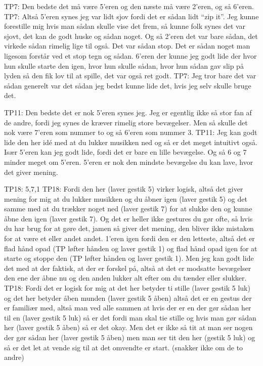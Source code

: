 TP7: Den bedste det må være 5’eren og den næste må være 2’eren, og så 6’eren. 
TP7: Altså 5’eren synes jeg var lidt sjov fordi det er sådan lidt “zip it”. Jeg kunne forestille mig hvis man sådan skulle vise det frem, så kunne folk synes det var sjovt, det kan de godt huske og sådan noget. Og så 2’eren det var bare sådan, det virkede sådan rimelig lige til også. Det var sådan stop. Det er sådan noget man ligesom forstår ved et stop tegn og sådan. 6’eren der kunne jeg godt lide der hvor hun skulle starte den igen, hvor hun skulle sådan, hvor hun sådan gav slip på lyden så den fik lov til at spille, det var også ret godt. 
TP7: Jeg tror bare det var sådan generelt var det sådan jeg bedst kunne lide det, hvis jeg selv skulle bruge det. 

TP11: Den bedste det er nok 5’eren synes jeg. Jeg er egentlig ikke så stor fan af de andre, fordi jeg synes de kræver rimelig store bevægelser. Men så skulle det nok være 7’eren som nummer to og så 6’eren som nummer 3. 
TP11: Jeg kan godt lide den her idé med at du lukker musikken ned og så er det meget intuitivt også. Især 5’eren kan jeg godt lide, fordi det er bare en lille bevægelse. Og så 6 og 7 minder meget om 5’eren. 5’eren er nok den mindste bevægelse du kan lave, hvor det giver mening. 

TP18: 5,7,1 
TP18: Fordi den her (laver gestik 5) virker logisk, altså det giver mening for mig at du lukker musikken og du åbner igen (laver gestik 5) og det samme med at du trækker noget ned (laver gestik 7) for at slukke den og kunne åbne den igen (laver gestik 7). Og det er heller ikke gestures du gør ofte, så hvis du har brug for at gøre det, jamen så giver det mening, den bliver ikke mistaken for at være et eller andet andet. 1’eren igen fordi den er den letteste, altså det er flad hånd opad (TP løfter hånden og laver gestik 1) og flad hånd opad igen for at starte og stoppe den (TP løfter hånden og laver gestik 1). Men jeg kan godt lide det med at der faktisk, at der er forskel på, altså at det er modsatte bevægelser den ene der åbne nu og den anden lukker alt efter om du tænder eller slukker. 
TP18: Fordi det er logisk for mig at det her betyder ti stille (laver gestik 5 luk) og det her betyder åben munden (laver gestik 5 åben) altså det er en gestus der er familiær med, altså man ved alle sammen at hvis der er en der gør sådan her til en (laver gestik 5 luk) så er det fordi man skal tie stille og hvis man gør sådan her (laver gestik 5 åben) så er det okay. Men det er ikke så tit at man ser nogen der gør sådan her (laver gestik 5 åben) men man ser tit den her (gestik 5 luk) og så er det let at vende sig til at det omvendte er start. (snakker ikke om de to andre)

